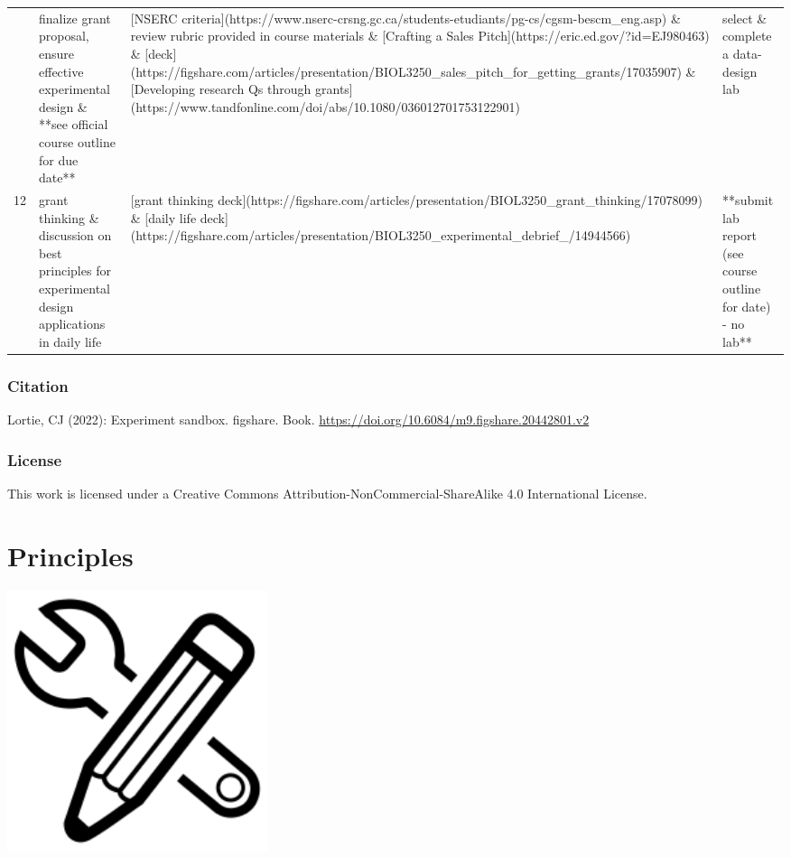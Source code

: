 \documentclass[
]{book}
\begin{document}
\begin{tabular}{rlll}
\addlinespace
11 & finalize grant proposal, ensure effective experimental design \& **see official course outline for due date** & {}[NSERC criteria](https://www.nserc-crsng.gc.ca/students-etudiants/pg-cs/cgsm-bescm\_eng.asp) \& review rubric provided in course materials \& [Crafting a Sales Pitch](https://eric.ed.gov/?id=EJ980463) \& [deck](https://figshare.com/articles/presentation/BIOL3250\_sales\_pitch\_for\_getting\_grants/17035907) \& [Developing research Qs through grants](https://www.tandfonline.com/doi/abs/10.1080/036012701753122901) & select \& complete a data-design lab\\
12 & grant thinking \& discussion on best principles for experimental design applications in daily life & {}[grant thinking deck](https://figshare.com/articles/presentation/BIOL3250\_grant\_thinking/17078099) \& [daily life deck](https://figshare.com/articles/presentation/BIOL3250\_experimental\_debrief\_/14944566) & **submit lab report (see course outline for date) - no lab**\\
\bottomrule
\end{tabular}

\hypertarget{citation}{%
\subsection*{Citation}\label{citation}}

Lortie, CJ (2022): Experiment sandbox. figshare. Book. \url{https://doi.org/10.6084/m9.figshare.20442801.v2}

\hypertarget{license}{%
\subsection*{License}\label{license}}

This work is licensed under a Creative Commons Attribution-NonCommercial-ShareAlike 4.0 International License.

\hypertarget{principles}{%
\chapter{Principles}\label{principles}}

\includegraphics[width=3in,height=\textheight]{./design.png}
\end{document}
